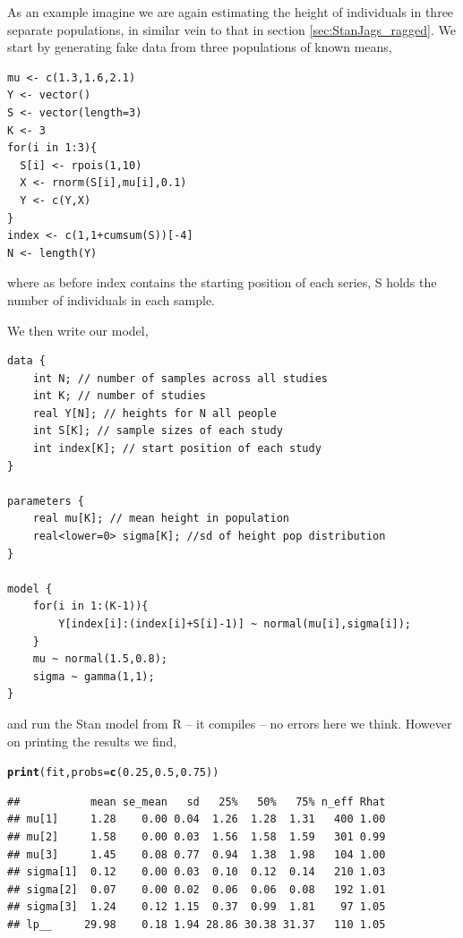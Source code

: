 \documentclass[11pt,fullpage]{book}
\makeatletter
\newenvironment{kframe}{%
	\def\at@end@of@kframe{}%
	\ifinner\ifhmode%
	\def\at@end@of@kframe{\end{minipage}}%
\begin{minipage}{\columnwidth}%
	\fi\fi%
	\def\FrameCommand##1{\hskip\@totalleftmargin \hskip-\fboxsep
		\colorbox{shadecolor}{##1}\hskip-\fboxsep
		\hskip-\linewidth \hskip-\@totalleftmargin \hskip\columnwidth}%
	\MakeFramed {\advance\hsize-\width
		\@totalleftmargin\z@ \linewidth\hsize
		\@setminipage}}%
{\par\unskip\endMakeFramed%
	\at@end@of@kframe}
\newcommand{\hlnum}[1]{\textcolor[rgb]{0.686,0.059,0.569}{#1}}%
\newcommand{\hlstd}[1]{\textcolor[rgb]{0.345,0.345,0.345}{#1}}%
\newcommand{\hlkwc}[1]{\textcolor[rgb]{0.333,0.667,0.333}{#1}}%
\newcommand{\hlkwd}[1]{\textcolor[rgb]{0.737,0.353,0.396}{\textbf{#1}}}%
\newenvironment{knitrout}{}{} %
\makeatother
\begin{document}
As an example imagine we are again estimating the height of individuals in three separate populations, in similar vein to that in section \ref{sec:StanJags_ragged}. We start by generating fake data from three populations of known means,

\begin{verbatim}
mu <- c(1.3,1.6,2.1)
Y <- vector()
S <- vector(length=3)
K <- 3
for(i in 1:3){
  S[i] <- rpois(1,10)
  X <- rnorm(S[i],mu[i],0.1)
  Y <- c(Y,X)
}
index <- c(1,1+cumsum(S))[-4]
N <- length(Y)
\end{verbatim}
where as before index contains the starting position of each series, S holds the number of individuals in each sample. 

We then write our model,

\begin{verbatim}
data {
    int N; // number of samples across all studies
    int K; // number of studies
    real Y[N]; // heights for N all people
    int S[K]; // sample sizes of each study
    int index[K]; // start position of each study
}

parameters {
    real mu[K]; // mean height in population
    real<lower=0> sigma[K]; //sd of height pop distribution
}

model {
    for(i in 1:(K-1)){
        Y[index[i]:(index[i]+S[i]-1)] ~ normal(mu[i],sigma[i]);
    }
    mu ~ normal(1.5,0.8);
    sigma ~ gamma(1,1);
}
\end{verbatim}

and run the Stan model from R -- it compiles -- no errors here we think. However on printing the results we find,

\begin{knitrout}\small
		\color{fgcolor}\begin{kframe}
\begin{alltt}
\hlkwd{print}\hlstd{(fit,}\hlkwc{probs} \hlstd{=} \hlkwd{c}\hlstd{(}\hlnum{0.25}\hlstd{,}\hlnum{0.5}\hlstd{,}\hlnum{0.75}\hlstd{))}
\end{alltt}
\begin{verbatim}
##           mean se_mean   sd   25%   50%   75% n_eff Rhat
## mu[1]     1.28    0.00 0.04  1.26  1.28  1.31   400 1.00
## mu[2]     1.58    0.00 0.03  1.56  1.58  1.59   301 0.99
## mu[3]     1.45    0.08 0.77  0.94  1.38  1.98   104 1.00
## sigma[1]  0.12    0.00 0.03  0.10  0.12  0.14   210 1.03
## sigma[2]  0.07    0.00 0.02  0.06  0.06  0.08   192 1.01
## sigma[3]  1.24    0.12 1.15  0.37  0.99  1.81    97 1.05
## lp__     29.98    0.18 1.94 28.86 30.38 31.37   110 1.05
\end{verbatim}
		\end{kframe}
	\end{knitrout}
\end{document}
